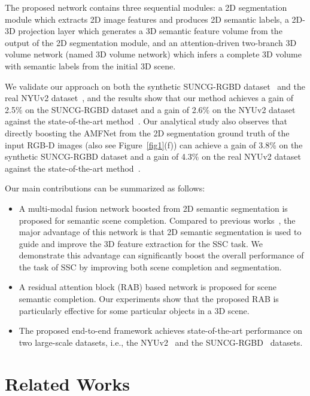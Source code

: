 \documentclass[letterpaper]{article} \usepackage{aaai20}  \usepackage{times}  \usepackage{helvet} \usepackage{courier}  \usepackage[hyphens]{url}  \usepackage{graphicx} \urlstyle{rm} \def\UrlFont{\rm}  \usepackage{graphicx}  \frenchspacing  \setlength{\pdfpagewidth}{8.5in}  \setlength{\pdfpageheight}{11in}
\begin{document}
The proposed network contains three sequential modules: a 2D segmentation module which extracts 2D image features and produces 2D semantic labels, a 2D-3D projection layer which generates a 3D semantic feature volume from the output of the 2D segmentation module, and an attention-driven two-branch 3D volume network (named 3D volume network) which infers a complete 3D volume with semantic labels from the initial 3D scene.

We validate our approach on both the synthetic SUNCG-RGBD dataset~\cite{Liu2018SeeAT} and the real NYUv2 dataset~\cite{Silberman2012IndoorSA}, and the results show that our method achieves a gain of 2.5\% on the SUNCG-RGBD dataset and a gain of 2.6\% on the NYUv2 dataset against the state-of-the-art method~\cite{Li2019RGBDBD}. Our analytical study also observes that directly boosting the AMFNet from the 2D segmentation ground truth of the input RGB-D images (also see Figure~\ref{fig1}(f)) can achieve a gain of 3.8\% on the synthetic SUNCG-RGBD dataset and a gain of 4.3\% on the real NYUv2 dataset against the state-of-the-art method~\cite{Li2019RGBDBD}. 

Our main contributions can be summarized as follows:
\begin{itemize}
\item A multi-modal fusion network boosted from 2D semantic segmentation is proposed for semantic scene completion. Compared to previous works~\cite{Song2016SemanticSC,Liu2018SeeAT,Li2019RGBDBD}, the major advantage of this network is that 2D semantic segmentation is used to guide and improve the 3D feature extraction for the SSC task. We demonstrate this advantage can significantly boost the overall performance of the task of SSC by improving both scene completion and segmentation. 

\item A residual attention block (RAB) based network is proposed for scene semantic completion. Our experiments show that the proposed RAB is particularly effective for some particular objects in a 3D scene.

\item The proposed end-to-end framework achieves state-of-the-art performance on two large-scale datasets, i.e., the NYUv2~\cite{Silberman2012IndoorSA} and the SUNCG-RGBD~\cite{Liu2018SeeAT} datasets.
\end{itemize}


\section{Related Works}
\end{document}
